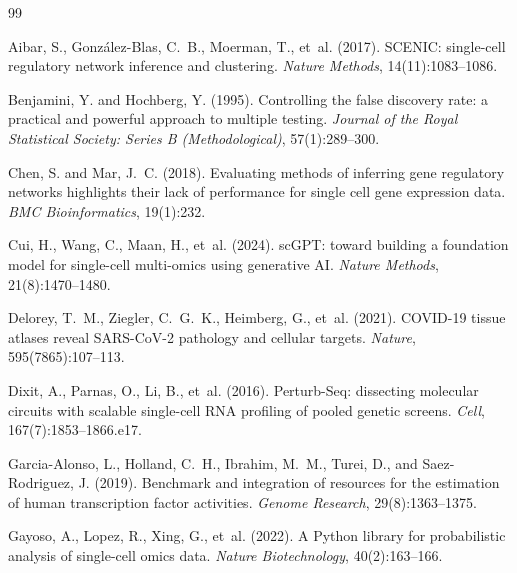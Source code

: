 \documentclass[unnumsec,webpdf,contemporary,large,namedate]{oup-authoring-template}
\begin{document}
\begin{thebibliography}{99}

Aibar, S., Gonz{\'a}lez-Blas, C.~B., Moerman, T., et~al. (2017).
\newblock SCENIC: single-cell regulatory network inference and clustering.
\newblock \textit{Nature Methods}, 14(11):1083--1086.

Benjamini, Y. and Hochberg, Y. (1995).
\newblock Controlling the false discovery rate: a practical and powerful
  approach to multiple testing.
\newblock \textit{Journal of the Royal Statistical Society: Series B
  (Methodological)}, 57(1):289--300.

Chen, S. and Mar, J.~C. (2018).
\newblock Evaluating methods of inferring gene regulatory networks highlights
  their lack of performance for single cell gene expression data.
\newblock \textit{BMC Bioinformatics}, 19(1):232.

Cui, H., Wang, C., Maan, H., et~al. (2024).
\newblock scGPT: toward building a foundation model for single-cell multi-omics
  using generative AI.
\newblock \textit{Nature Methods}, 21(8):1470--1480.

Delorey, T.~M., Ziegler, C.~G.~K., Heimberg, G., et~al. (2021).
\newblock COVID-19 tissue atlases reveal SARS-CoV-2 pathology and cellular
  targets.
\newblock \textit{Nature}, 595(7865):107--113.

Dixit, A., Parnas, O., Li, B., et~al. (2016).
\newblock Perturb-Seq: dissecting molecular circuits with scalable single-cell
  RNA profiling of pooled genetic screens.
\newblock \textit{Cell}, 167(7):1853--1866.e17.

Garcia-Alonso, L., Holland, C.~H., Ibrahim, M.~M., Turei, D., and
  Saez-Rodriguez, J. (2019).
\newblock Benchmark and integration of resources for the estimation of human
  transcription factor activities.
\newblock \textit{Genome Research}, 29(8):1363--1375.

Gayoso, A., Lopez, R., Xing, G., et~al. (2022).
\newblock A Python library for probabilistic analysis of single-cell omics data.
\newblock \textit{Nature Biotechnology}, 40(2):163--166.


\end{thebibliography}
\end{document}
